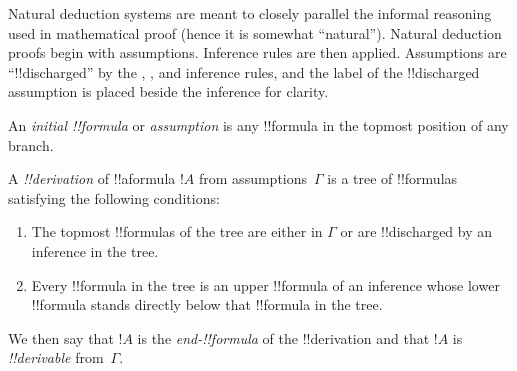 \documentclass[../../../include/open-logic-section]{subfiles}
\begin{document}
\begin{explain}
Natural deduction systems are meant to closely parallel the informal
reasoning used in mathematical proof (hence it is somewhat
``natural''). Natural deduction proofs begin with assumptions.
Inference rules are then applied. Assumptions are ``!!{discharged}''
by the \Intro{\lnot}, \Intro{\lif}, \Elim{\lor} and \Elim{\lexists}
inference rules, and the label of the !!{discharged} assumption is
placed beside the inference for clarity.
\end{explain}

\begin{defn}
An \emph{initial !!{formula}} or \emph{assumption} is any !!{formula}
in the topmost position of any branch.
\end{defn}

\begin{defn}[!!^{derivation}]
A \emph{!!{derivation}} of !!a{formula} $!A$ from assumptions~$\Gamma$
is a tree of !!{formula}s satisfying the following conditions:
\begin{enumerate}
\item The topmost !!{formula}s of the tree are either in $\Gamma$ or
  are !!{discharged} by an inference in the tree.
\item Every !!{formula} in the tree is an upper !!{formula} of an
  inference whose lower !!{formula} stands directly below that !!{formula} in
  the tree.
\end{enumerate}
We then say that $!A$ is the \emph{end-!!{formula}} of the
!!{derivation} and that $!A$ is \emph{!!{derivable}} from~$\Gamma$.
\end{defn}
\end{document}
